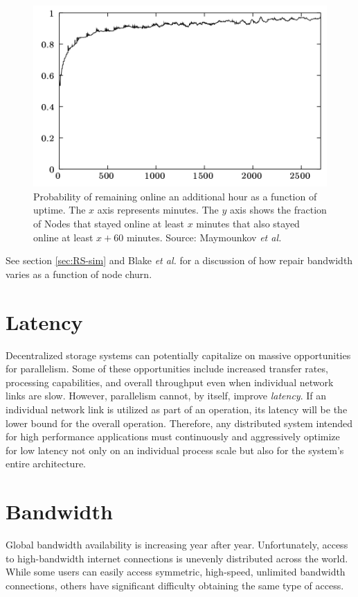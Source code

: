 \documentclass[8pt,fleqn,openany]{book}
\begin{document}
\begin{figure}[!htbp]
\centering
\includegraphics[width=.6\textwidth]{images/uptime.png}
\caption{Probability of remaining online an additional hour as a function of
uptime.
The $x$ axis represents minutes. The $y$ axis shows the fraction of Nodes
that stayed online at least $x$ minutes that also stayed online at least
$x+60$ minutes. Source: Maymounkov {\em et al.} \cite{kad}}
\label{fig:kad-uptime}
\end{figure}

See section \ref{sec:RS-sim} and Blake {\em et al.} \cite{pick2-churn} for a
discussion of how repair bandwidth varies as a function of node churn.

\section{Latency}

Decentralized storage systems can potentially capitalize on
massive opportunities for parallelism.
Some of these opportunities include increased transfer rates, processing
capabilities, and overall throughput even when individual
network links are slow. However, parallelism cannot, by itself, improve {\em
latency}. If an individual network link is utilized as part of an operation,
its latency will be the lower bound for the overall operation.
Therefore, any distributed system
intended for high performance applications must continuously and aggressively
optimize for low latency not only on an individual process scale but also for
the system's entire architecture.

\section{Bandwidth}\label{sec:req-bandwidth}

Global bandwidth availability is increasing year after year. Unfortunately,
access to
high-bandwidth internet connections is unevenly distributed across the world.
While some users can easily access symmetric, high-speed, unlimited bandwidth
connections, others have significant difficulty obtaining the same type of
access.
\end{document}
